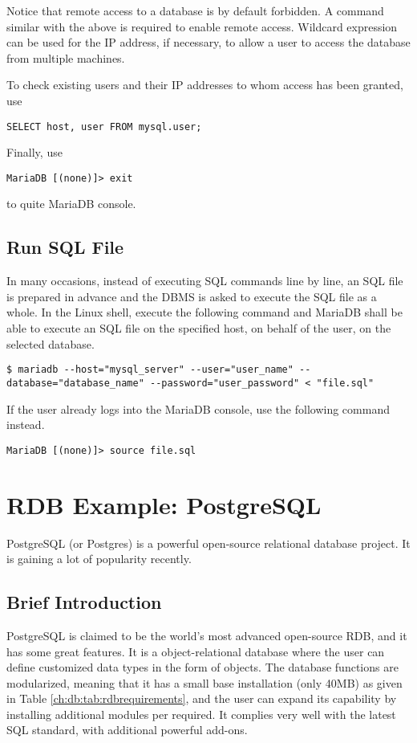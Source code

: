 Notice that remote access to a database is by default forbidden. A command similar with the above is required to enable remote access. Wildcard expression can be used for the IP address, if necessary, to allow a user to access the database from multiple machines.

To check existing users and their IP addresses to whom access has been granted, use
\begin{lstlisting}
SELECT host, user FROM mysql.user;
\end{lstlisting}

Finally, use
\begin{lstlisting}
MariaDB [(none)]> exit
\end{lstlisting}
to quite MariaDB console.

\section{Run SQL File}

In many occasions, instead of executing SQL commands line by line, an SQL file is prepared in advance and the DBMS is asked to execute the SQL file as a whole. In the Linux shell, execute the following command and MariaDB shall be able to execute an SQL file on the specified host, on behalf of the user, on the selected database.
\begin{lstlisting}
$ mariadb --host="mysql_server" --user="user_name" --database="database_name" --password="user_password" < "file.sql"
\end{lstlisting}
If the user already logs into the MariaDB console, use the following command instead.
\begin{lstlisting}
MariaDB [(none)]> source file.sql
\end{lstlisting}

\chapter{RDB Example: PostgreSQL}

PostgreSQL (or Postgres) is a powerful open-source relational database project. It is gaining a lot of popularity recently.

\section{Brief Introduction}

PostgreSQL is claimed to be the world's most advanced open-source RDB, and it has some great features. It is a object-relational database where the user can define customized data types in the form of objects. The database functions are modularized, meaning that it has a small base installation (only 40MB) as given in Table \ref{ch:db:tab:rdbrequirements}, and the user can expand its capability by installing additional modules per required. It complies very well with the latest SQL standard, with additional powerful add-ons.

